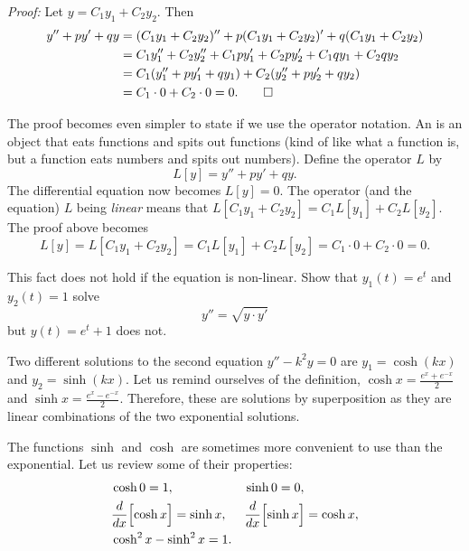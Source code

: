 \medskip

\emph{Proof:}
Let 
$y = C_1 y_1 + C_2 y_2$.  Then
\begin{equation*}
\begin{split}
y'' + py' + qy & =
(C_1 y_1 + C_2 y_2)'' + p(C_1 y_1 + C_2 y_2)' + q(C_1 y_1 + C_2 y_2) \\
& = C_1 y_1'' + C_2 y_2'' + C_1 p y_1' + C_2 p y_2' + C_1 q y_1 + C_2 q y_2 \\
& = C_1 ( y_1'' + p y_1' + q y_1 ) + C_2 ( y_2'' + p y_2' + q y_2 ) \\
& = C_1 \cdot 0 + C_2 \cdot 0 = 0 . \qed
\end{split}
\end{equation*}

\medskip

The proof becomes even simpler to state if we use the
operator notation.
An \emph{} is an object that eats functions and spits out functions (kind of
like what a function is, but a function eats numbers and spits out numbers).
Define the operator $L$ by
\begin{equation*}
L[y] = y'' + py' + qy .
\end{equation*}
The differential equation now becomes $L[y]=0$.
The operator (and the equation)
$L$ being \emph{linear} means that $L[C_1y_1 + C_2y_2] = 
C_1 L[y_1] + C_2 L[y_2]$.  The proof above becomes
\begin{equation*}
L[y] = L[C_1y_1 + C_2y_2] = 
C_1 L[y_1] + C_2 L[y_2] = C_1 \cdot 0 + C_2 \cdot 0 = 0 .
\end{equation*}

\begin{exercise}
This fact does not hold if the equation is non-linear. Show that $y_1(t) = e^t$ and $y_2(t) = 1$ solve 
\begin{equation*}
y'' = \sqrt{y\cdot y'}
\end{equation*}
but $y(t) = e^t + 1$ does not.
\end{exercise}


Two different solutions to the second equation $y'' - k^2y = 0$ are
$y_1 = \cosh (kx)$ and $y_2 = \sinh (kx)$.  Let us remind ourselves of the
definition, $\cosh x = \frac{e^x  + e^{-x}}{2}$ and
$\sinh x = \frac{e^x - e^{-x}}{2}$.  Therefore, these are solutions by
superposition as they
are linear combinations of the two
exponential solutions.

The functions $\sinh$ and $\cosh$ are sometimes more convenient to use than the
exponential.  Let us review some of their properties:
\begin{align*}
& \cosh 0  = 1 , &   & \sinh 0 = 0 , \\
& \frac{d}{dx} \Bigl[ \cosh x \Bigr] = \sinh x , &  & \frac{d}{dx} \Bigl[ \sinh x \Bigr] = \cosh x , \\
& \cosh^2 x - \sinh^2 x = 1 .
\end{align*}


